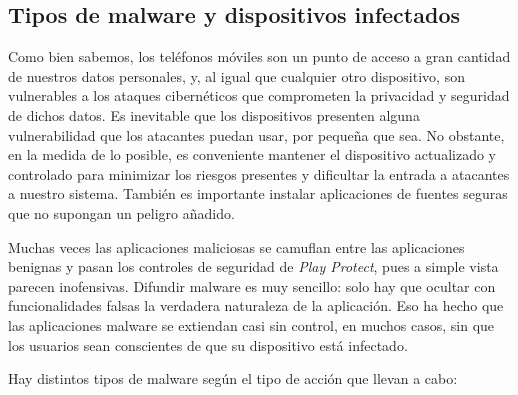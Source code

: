 \subsection{Tipos de malware y dispositivos infectados}

Como bien sabemos, los teléfonos móviles son un punto de acceso a gran cantidad de nuestros datos personales, y, al igual que cualquier otro dispositivo, son vulnerables a los ataques cibernéticos que comprometen la privacidad y seguridad de dichos datos. Es inevitable que los dispositivos presenten alguna vulnerabilidad que los atacantes puedan usar, por pequeña que sea. No obstante, en la medida de lo posible, es conveniente mantener el dispositivo actualizado y controlado para minimizar los riesgos presentes y dificultar la entrada a atacantes a nuestro sistema. También es importante instalar aplicaciones de fuentes seguras que no supongan un peligro añadido.

Muchas veces las aplicaciones maliciosas se camuflan entre las aplicaciones benignas y pasan los controles de seguridad de \textit{Play Protect}, pues a simple vista parecen inofensivas. Difundir malware es muy sencillo: solo hay que ocultar con funcionalidades falsas la verdadera naturaleza de la aplicación. Eso ha hecho que las aplicaciones malware se extiendan casi sin control, en muchos casos, sin que los usuarios sean conscientes de que su dispositivo está infectado.

Hay distintos tipos de malware según el tipo de acción que llevan a cabo\hypersetup{citecolor=red}\cite{malwaredetection}:

